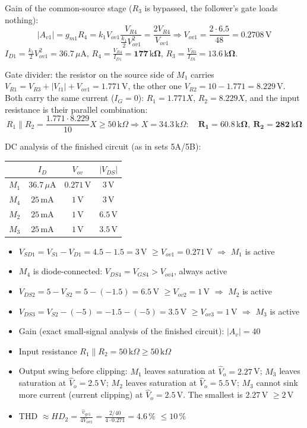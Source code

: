 \documentclass[11pt]{article}
\newcommand{\solstep}[2]{\par\medskip{\color{stepc}\textbf{Step #1 --- #2}}\par\nopagebreak}
\begin{document}
Gain of the common-source stage ($R_3$ is bypassed, the follower's gate loads nothing): \[|A_{v1}| = g_{m1}R_4 = k_1V_{ov1}\frac{V_{R4}}{\frac{k_1}{2}V_{ov1}^2} = \frac{2V_{R4}}{V_{ov1}} \Rightarrow V_{ov1} = \frac{2\cdot6.5}{48} = 0.2708\,\mathrm{V}\]$I_{D1} = \frac{k_1}{2}V_{ov1}^2 = 36.7\,\mu \mathrm{A}$, $R_4 = \frac{V_{R4}}{I_{D1}} = \mathbf{177\,\mathrm{k}\Omega}$, $R_3 = \frac{V_{R3}}{I_{D1}} = \mathbf{13.6\,\mathrm{k}\Omega}$.

Gate divider: the resistor on the source side of $M_1$ carries $V_{R1} = V_{R3} + |V_{t1}| + V_{ov1} = 1.771$\,V, the other one $V_{R2} = 10 - 1.771 = 8.229$\,V. Both carry the same current ($I_G = 0$): $R_{1} = 1.771X$, $R_{2} = 8.229X$, and the input resistance is their parallel combination: \[R_1\|R_2 = \frac{1.771\cdot8.229}{10}X \ge 50\,\mathrm{k}\Omega \Rightarrow X = 34.3\,\mathrm{k}\Omega:\quad \mathbf{R_1 = 60.8\,\mathrm{k}\Omega},\ \mathbf{R_2 = 282\,\mathrm{k}\Omega}\]
\solstep{4}{Check by analysis}DC analysis of the finished circuit (as in sets 5A/5B):\begin{center}\renewcommand{\arraystretch}{1.35}
\begin{tabular}{cccc}
\toprule
 & $I_D$ & $V_{ov}$ & $|V_{DS}|$ \\
\midrule
$M_{1}$ & $36.7\,\mu \mathrm{A}$ & $0.271$\,V & $3$\,V \\
$M_{4}$ & $25\,\mathrm{m}\mathrm{A}$ & $1$\,V & $3$\,V \\
$M_{2}$ & $25\,\mathrm{m}\mathrm{A}$ & $1$\,V & $6.5$\,V \\
$M_{3}$ & $25\,\mathrm{m}\mathrm{A}$ & $1$\,V & $3.5$\,V \\
\bottomrule
\end{tabular}\end{center}
\begin{itemize}[leftmargin=*,itemsep=2pt]
\item $V_{SD1} = V_{S1} - V_{D1} = 4.5 - 1.5 = 3\,\mathrm{V}$ $\ge V_{ov1} = 0.271$\,V $\Rightarrow$ $M_{1}$ is active \checkmark
\item $M_{4}$ is diode-connected: $V_{DS4} = V_{GS4} > V_{ov4}$, always active \checkmark
\item $V_{DS2} = 5 - V_{S2} = 5 - (-1.5) = 6.5\,\mathrm{V}$ $\ge V_{ov2} = 1$\,V $\Rightarrow$ $M_{2}$ is active \checkmark
\item $V_{DS3} = V_{S2} - (-5) = -1.5 - (-5) = 3.5\,\mathrm{V}$ $\ge V_{ov3} = 1$\,V $\Rightarrow$ $M_{3}$ is active \checkmark
\item Gain (exact small-signal analysis of the finished circuit): $|A_v| = 40$ \checkmark
\item Input resistance $R_1\|R_2 = 50\,\mathrm{k}\Omega \ge 50\,\mathrm{k}\Omega$ \checkmark
\item Output swing before clipping: $M_1$ leaves saturation at $\hat V_o = 2.27$\,V; $M_3$ leaves saturation at $\hat V_o = 2.5$\,V; $M_2$ leaves saturation at $\hat V_o = 5.5$\,V; $M_3$ cannot sink more current (current clipping) at $\hat V_o = 2.5$\,V. The smallest is $2.27$\,V $\ge 2$\,V \checkmark
\item THD $\approx HD_2 = \frac{\hat v_{gs1}}{4V_{ov1}} = \frac{2/40}{4\cdot0.271} = 4.6\,\%$ $\le 10\,\%$ \checkmark
\end{itemize}
\end{document}
